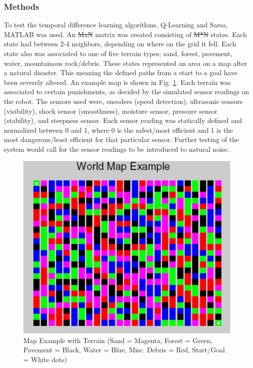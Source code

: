 \documentclass[12pt,american]{report}
\providecommand{\DIFaddtex}[1]{{\protect\color{blue}\uwave{#1}}} %
\providecommand{\DIFdeltex}[1]{{\protect\color{red}\sout{#1}}}                      %
\providecommand{\DIFaddbegin}{} %
\providecommand{\DIFaddend}{} %
\providecommand{\DIFdelbegin}{} %
\providecommand{\DIFdelend}{} %
\providecommand{\DIFaddFL}[1]{\DIFadd{#1}} %
\providecommand{\DIFaddbeginFL}{} %
\providecommand{\DIFaddendFL}{} %
\providecommand{\DIFdelbeginFL}{} %
\providecommand{\DIFdelendFL}{} %
\providecommand{\DIFadd}[1]{\texorpdfstring{\DIFaddtex{#1}}{#1}} %
\providecommand{\DIFdel}[1]{\texorpdfstring{\DIFdeltex{#1}}{}} %
\newcommand{\DIFscaledelfig}{0.5}
\newlength{\DIFdelgraphicswidth} %
\newlength{\DIFdelgraphicsheight} %
\newcommand{\DIFaddincludegraphics}[2][]{{\color{blue}\fbox{\DIFOincludegraphics[#1]{#2}}}} %
\newcommand{\DIFdelincludegraphics}[2][]{%
\sbox{\DIFdelgraphicsbox}{\DIFOincludegraphics[#1]{#2}}%
\settoboxwidth{\DIFdelgraphicswidth}{\DIFdelgraphicsbox} %
\settoboxtotalheight{\DIFdelgraphicsheight}{\DIFdelgraphicsbox} %
\scalebox{\DIFscaledelfig}{%
\parbox[b]{\DIFdelgraphicswidth}{\usebox{\DIFdelgraphicsbox}\\[-\baselineskip] \rule{\DIFdelgraphicswidth}{0em}}\llap{\resizebox{\DIFdelgraphicswidth}{\DIFdelgraphicsheight}{%
\setlength{\unitlength}{\DIFdelgraphicswidth}%
\begin{picture}(1,1)%
\thicklines\linethickness{2pt} %
{\color[rgb]{1,0,0}\put(0,0){\framebox(1,1){}}}%
{\color[rgb]{1,0,0}\put(0,0){\line( 1,1){1}}}%
{\color[rgb]{1,0,0}\put(0,1){\line(1,-1){1}}}%
\end{picture}%
}\hspace*{3pt}}} %
} %
\DeclareRobustCommand{\DIFaddbegin}{\DIFOaddbegin \let\includegraphics\DIFaddincludegraphics} %
\DeclareRobustCommand{\DIFaddend}{\DIFOaddend \let\includegraphics\DIFOincludegraphics} %
\DeclareRobustCommand{\DIFdelbegin}{\DIFOdelbegin \let\includegraphics\DIFdelincludegraphics} %
\DeclareRobustCommand{\DIFdelend}{\DIFOaddend \let\includegraphics\DIFOincludegraphics} %
\DeclareRobustCommand{\DIFaddbeginFL}{\DIFOaddbeginFL \let\includegraphics\DIFaddincludegraphics} %
\DeclareRobustCommand{\DIFaddendFL}{\DIFOaddendFL \let\includegraphics\DIFOincludegraphics} %
\DeclareRobustCommand{\DIFdelbeginFL}{\DIFOdelbeginFL \let\includegraphics\DIFdelincludegraphics} %
\DeclareRobustCommand{\DIFdelendFL}{\DIFOaddendFL \let\includegraphics\DIFOincludegraphics} %
\begin{document}
\subsubsection{Methods}

To test the temporal difference learning algorithms, Q-Learning and Sarsa, MATLAB was used. An \DIFdelbegin \DIFdel{MxN }\DIFdelend \DIFaddbegin \DIFadd{$M\times N$ }\DIFaddend matrix was created consisting of \DIFdelbegin \DIFdel{M*N }\DIFdelend \DIFaddbegin \DIFadd{$M*N$ }\DIFaddend states.  Each state had between 2-4 neighbors, depending on where on the grid it fell.  Each state also was associated to one of five terrain types; sand, forest, pavement, water, mountainous rock/debris.  These states represented an area on a map after a natural disaster.  This meaning the defined paths from a start to a goal have been severely altered. An example map is shown in Fig. \ref{fig:map-example}. Each terrain was associated to certain punishments, as decided by the simulated sensor readings on the robot.  The sensors used were, encoders (speed detection), ultrasonic sensors (visibility), shock sensor (smoothness), moisture sensor, pressure sensor (stability), and steepness sensor.  Each sensor reading was statically defined and normalized between 0 and 1, where 0 is the safest/most efficient and 1 is the most dangerous/least efficient for that particular sensor. Further testing of the system would call for the sensor readings to be introduced to natural noise.

\begin{figure}
\centering
\DIFdelbeginFL %
\DIFdelendFL \DIFaddbeginFL \includegraphics[scale=.75]{images/map-example.PNG}
\DIFaddendFL \caption{Map Example with Terrain (Sand = Magenta, Forest = Green, Pavement = Black, Water = Blue, Misc. Debris = Red, Start/Goal = White dots)\DIFaddbeginFL \DIFaddFL{.}\DIFaddendFL }
\label{fig:map-example}
\end{figure}
\end{document}

